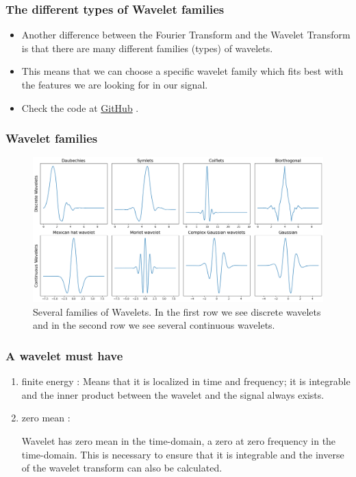 \documentclass{beamer}
\newcommand{\github}{
\href{https://github.com/A-M-Kharazi/Machine-Learning-TMU}{GitHub}
}
\begin{document}
\begin{frame}
	\frametitle{The different types of Wavelet families}
	
	\begin{itemize}
		\item
			Another difference between the Fourier Transform and the Wavelet Transform is that there are many different families (types) of wavelets.
		
		\item
		
		This means that we can choose a specific wavelet family which fits best with the features we are looking for in our signal.
		
		\item Check the code at \github.
	\end{itemize}
	

\end{frame}


\begin{frame}
	\frametitle{Wavelet families}
	\begin{center}
			\begin{figure}
			\includegraphics[scale=0.25]{wavelet_families.png}
			\caption{ Several families of Wavelets. In the first row we see discrete wavelets and in the second row we see several continuous wavelets.}
		\end{figure}
	\end{center}
	
\end{frame}


\begin{frame}
	\frametitle{A wavelet must have}
	
	\begin{enumerate}
		\item
		 finite energy : Means that it is localized in time and frequency; it is integrable and the inner product between the wavelet and the signal always exists.
		\item
		zero mean : 
		
		Wavelet has zero mean in the time-domain, a zero at zero frequency in the time-domain. This is necessary to ensure that it is integrable and the inverse of the wavelet transform can also be calculated.
		
	\end{enumerate}
	
\end{frame}
\end{document}
